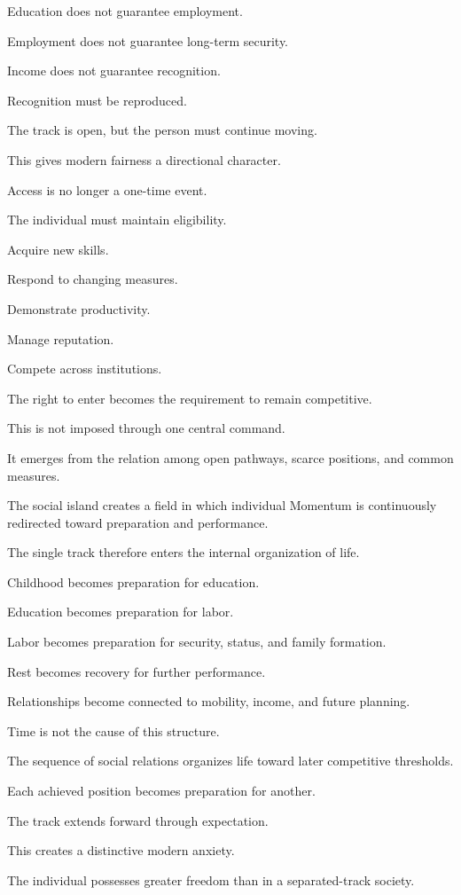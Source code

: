 Education does not guarantee employment.

Employment does not guarantee long-term security.

Income does not guarantee recognition.

Recognition must be reproduced.

The track is open, but the person must continue moving.

This gives modern fairness a directional character.

Access is no longer a one-time event.

The individual must maintain eligibility.

Acquire new skills.

Respond to changing measures.

Demonstrate productivity.

Manage reputation.

Compete across institutions.

The right to enter becomes the requirement to remain competitive.

This is not imposed through one central command.

It emerges from the relation among open pathways, scarce positions, and common measures.

The social island creates a field in which individual Momentum is continuously redirected toward preparation and performance.

The single track therefore enters the internal organization of life.

Childhood becomes preparation for education.

Education becomes preparation for labor.

Labor becomes preparation for security, status, and family formation.

Rest becomes recovery for further performance.

Relationships become connected to mobility, income, and future planning.

Time is not the cause of this structure.

The sequence of social relations organizes life toward later competitive thresholds.

Each achieved position becomes preparation for another.

The track extends forward through expectation.

This creates a distinctive modern anxiety.

The individual possesses greater freedom than in a separated-track society.

